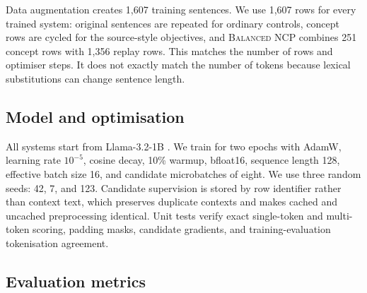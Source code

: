 \documentclass[11pt]{article}
\newcommand{\method}{\textsc{Balanced NCP}}
\begin{document}
Data augmentation creates 1,607 training sentences. We use 1,607 rows for every
trained system: original sentences are repeated for ordinary controls, concept
rows are cycled for the source-style objectives, and \method{} combines 251
concept rows with 1,356 replay rows. This matches the number of rows and optimiser
steps. It does not exactly match the number of tokens because lexical
substitutions can change sentence length.

\subsection{Model and optimisation}

All systems start from Llama-3.2-1B \citep{grattafiori2024llama}. We train for two
epochs with AdamW, learning rate $10^{-5}$, cosine decay, 10\% warmup, bfloat16,
sequence length 128, effective batch size 16, and candidate microbatches of eight.
We use three random seeds: 42, 7, and 123. Candidate supervision is stored by row
identifier rather than context text, which preserves duplicate contexts and
makes cached and uncached preprocessing identical. Unit tests verify exact
single-token and multi-token scoring, padding masks, candidate gradients, and
training-evaluation tokenisation agreement.

\subsection{Evaluation metrics}
\end{document}
